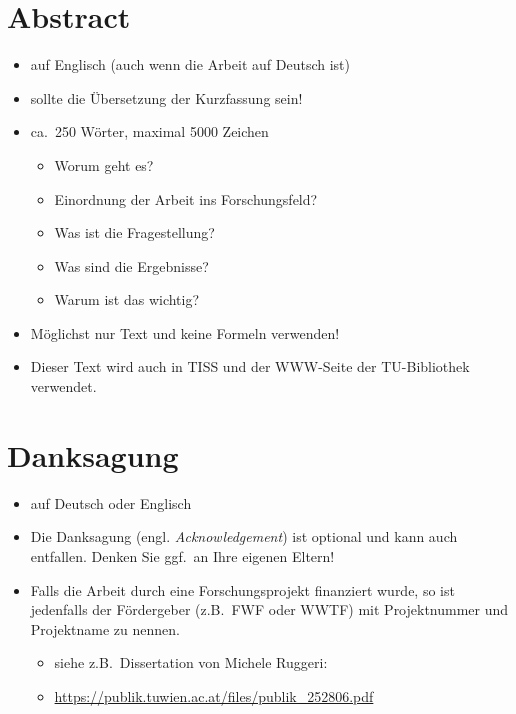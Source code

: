 \documentclass[a4paper,11pt,bibliography=totoc,listof=totoc,headinclude=true,cleardoublepage=empty,oneside]{NumPDEsThesis}
\begin{document}
\chapter*{Abstract}
\thispagestyle{empty}

{

\begin{itemize}
\item auf Englisch (auch wenn die Arbeit auf Deutsch ist)
\item sollte die Übersetzung der Kurzfassung sein!
\item ca.\ 250 Wörter, maximal 5000 Zeichen
\begin{itemize}
\item Worum geht es?
\item Einordnung der Arbeit ins Forschungsfeld?
\item Was ist die Fragestellung?
\item Was sind die Ergebnisse?
\item Warum ist das wichtig?
\end{itemize}
\item Möglichst nur Text und keine Formeln verwenden!
\item Dieser Text wird auch in TISS und der WWW-Seite der TU-Bibliothek verwendet.
\end{itemize}

}

\cleardoublepage


\chapter*{Danksagung} %
\thispagestyle{empty}

\begin{itemize}
\item auf Deutsch oder Englisch
\item Die Danksagung (engl. {\em Acknowledgement}) ist optional und kann auch entfallen. Denken Sie ggf.\ an Ihre eigenen Eltern!

\item Falls die Arbeit durch eine Forschungsprojekt finanziert wurde, so ist jedenfalls der Fördergeber (z.B.\ FWF oder WWTF) mit Projektnummer und Projektname zu nennen.
\begin{itemize}
\item siehe z.B.\ Dissertation von Michele Ruggeri:
\item[] \href{https://publik.tuwien.ac.at/files/publik_252806.pdf}{\ttfamily https://publik.tuwien.ac.at/files/publik\_252806.pdf}
\end{itemize}

\end{itemize}
\end{document}
